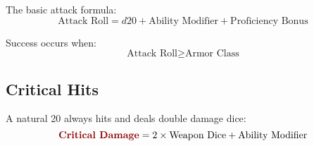 \documentclass[11pt,letterpaper,openany]{book}
\newcommand{\damage}[1]{\textcolor{bloodred}{\textbf{#1}}}
\begin{document}
The basic attack formula:
\begin{equation}
\text{Attack Roll} = d20 + \text{Ability Modifier} + \text{Proficiency Bonus}
\end{equation}

Success occurs when:
\begin{equation}
\text{Attack Roll} \geq \text{Armor Class}
\end{equation}

\subsection{Critical Hits}

A natural 20 always hits and deals double damage dice:
\begin{equation}
\damage{Critical Damage} = 2 \times \text{Weapon Dice} + \text{Ability Modifier}
\end{equation}
\end{document}
